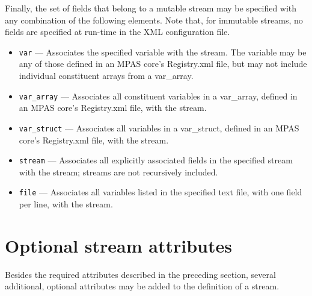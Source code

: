 Finally, the set of fields that belong to a mutable stream may be specified with any combination of the following elements. Note that, for 
immutable streams, no fields are specified at run-time in the XML configuration file.

\begin{itemize}
\item {\tt var} --- Associates the specified variable with the stream. The variable may be any of those defined in an MPAS core's Registry.xml file, but may
not include individual constituent arrays from a var\_array.
\item {\tt var\_array} --- Associates all constituent variables in a var\_array, defined in an MPAS core's Registry.xml file, with the stream.
\item {\tt var\_struct} --- Associates all variables in a var\_struct, defined in an MPAS core's Registry.xml file, with the stream.
\item {\tt stream} --- Associates all explicitly associated fields in the specified stream with the stream; streams are not recursively included.
\item {\tt file} --- Associates all variables listed in the specified text file, with one field per line, with the stream.
\end{itemize}

\pagebreak

\section{Optional stream attributes}
\label{sec:optional_stream_atts} 

Besides the required attributes described in the preceding section, several additional, optional attributes may be added to
the definition of a stream.

